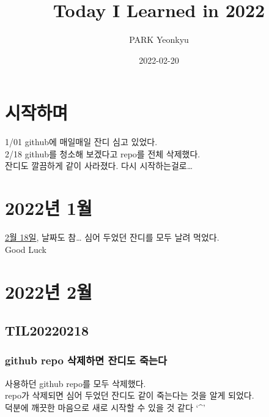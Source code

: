 \documentclass[
]{book}
\title{Today I Learned in 2022}
\author{PARK Yeonkyu}
\date{2022-02-20}
\begin{document}
\maketitle

{
\setcounter{tocdepth}{1}
\tableofcontents
}
\hypertarget{uxc2dcuxc791uxd558uxba70}{%
\chapter{시작하며}\label{uxc2dcuxc791uxd558uxba70}}

1/01 github에 매일매일 잔디 심고 있었다.\\
2/18 github를 청소해 보겠다고 repo를 전체 삭제했다.\\
잔디도 깔끔하게 같이 사라졌다.
다시 시작하는걸로\ldots{}

\hypertarget{uxb144-1uxc6d4}{%
\chapter{2022년 1월}\label{uxb144-1uxc6d4}}

\protect\hyperlink{github-repo-uxc0aduxc81cuxd558uxba74-uxc794uxb514uxb3c4-uxc8fduxb294uxb2e4}{2월 18일}, 날짜도 참\ldots{} 심어 두었던 잔디를 모두 날려 먹었다.\\
Good Luck

\hypertarget{uxb144-2uxc6d4}{%
\chapter{2022년 2월}\label{uxb144-2uxc6d4}}

\hypertarget{til20220218}{%
\section{TIL20220218}\label{til20220218}}

\hypertarget{github-repo-uxc0aduxc81cuxd558uxba74-uxc794uxb514uxb3c4-uxc8fduxb294uxb2e4}{%
\subsection{github repo 삭제하면 잔디도 죽는다}\label{github-repo-uxc0aduxc81cuxd558uxba74-uxc794uxb514uxb3c4-uxc8fduxb294uxb2e4}}

사용하던 github repo를 모두 삭제했다.\\
repo가 삭제되면 심어 두었던 잔디도 같이 죽는다는 것을 알게 되었다.\\
덕분에 깨끗한 마음으로 새로 시작할 수 있을 것 같다 `\^{}'
\end{document}
